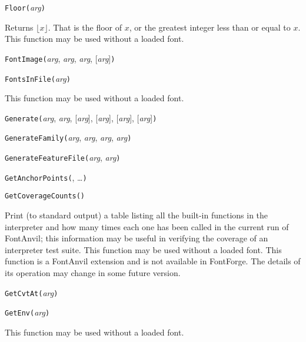 \noindent\texttt{Floor(}\textit{arg}\texttt{)}

Returns $\lfloor x \rfloor$.  That is the floor of $x$, or the greatest
integer less than or equal to $x$.  This function may be used without a
loaded font.


\noindent\texttt{FontImage(}\textit{arg}, \textit{arg}, \textit{arg}, [\textit{arg}]\texttt{)}


\noindent\texttt{FontsInFile(}\textit{arg}\texttt{)}

This function may be used without a loaded font.


\noindent\texttt{Generate(}\textit{arg}, \textit{arg}, [\textit{arg}], [\textit{arg}], [\textit{arg}], [\textit{arg}]\texttt{)}


\noindent\texttt{GenerateFamily(}\textit{arg}, \textit{arg}, \textit{arg}, \textit{arg}\texttt{)}


\noindent\texttt{GenerateFeatureFile(}\textit{arg}, \textit{arg}\texttt{)}


\noindent\texttt{GetAnchorPoints(}, \ldots\texttt{)}


\noindent\texttt{GetCoverageCounts()}

Print (to standard output) a table listing all the built-in functions in the
interpreter and how many times each one has been called in the current run
of FontAnvil; this information may be useful in verifying the coverage of an
interpreter test suite.
This function may be used without a loaded font.  This function is a
FontAnvil extension and is not available in FontForge.  The details of its
operation may change in some future version.


\noindent\texttt{GetCvtAt(}\textit{arg}\texttt{)}


\noindent\texttt{GetEnv(}\textit{arg}\texttt{)}

This function may be used without a loaded font.


